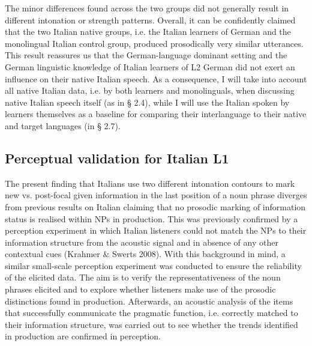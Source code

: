 \begin{styleStandard}
The minor differences found across the two groups did not generally result in different intonation or strength patterns. Overall, it can be confidently claimed that the two Italian native groups, i.e. the Italian learners of German and the monolingual Italian control group, produced prosodically very similar utterances. This result reassures us that the German-language dominant setting and the German linguistic knowledge of Italian learners of L2 German did not exert an influence on their native Italian speech. As a consequence, I will take into account all native Italian data, i.e. by both learners and monolinguals, when discussing native Italian speech itself (as in § 2.4), while I will use the Italian spoken by learners themselves as a baseline for comparing their interlanguage to their native and target languages (in § 2.7).
\end{styleStandard}

\subsection{Perceptual validation for Italian L1}
\hypertarget{Toc191305900}{}\begin{styleStandard}
The present finding that Italians use two different intonation contours to mark new vs. post-focal given information in the last position of a noun phrase diverges from previous results on Italian claiming that no prosodic marking of information status is realised within NPs in production. This was previously confirmed by a perception experiment in which Italian listeners could not match the NPs to their information structure from the acoustic signal and in absence of any other contextual cues (Krahmer \& Swerts 2008). With this background in mind, a similar small-scale perception experiment was conducted to ensure the reliability of the elicited data. The aim is to verify the representativeness of the noun phrases elicited and to explore whether listeners make use of the prosodic distinctions found in production. Afterwards, an acoustic analysis of the items that successfully communicate the pragmatic function, i.e. correctly matched to their information structure, was carried out to see whether the trends identified in production are confirmed in perception.
\end{styleStandard}

